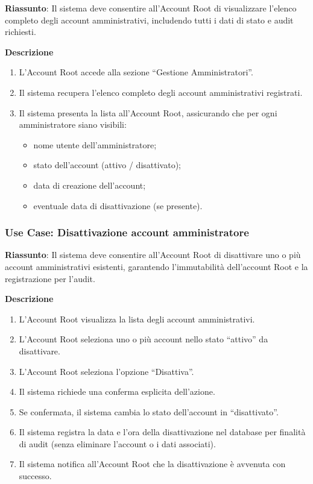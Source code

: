 \documentclass{article}
\begin{document}
\textbf{Riassunto}: Il sistema deve consentire all'Account Root di visualizzare l'elenco completo degli account amministrativi, includendo tutti i dati di stato e audit richiesti.

\textbf{Descrizione}
\begin{enumerate}
    \item L'Account Root accede alla sezione ``Gestione Amministratori''.
    \item Il sistema recupera l'elenco completo degli account amministrativi registrati.
    \item Il sistema presenta la lista all'Account Root, assicurando che per ogni amministratore siano visibili:
    \begin{itemize}
        \item nome utente dell'amministratore;
        \item stato dell'account (attivo / disattivato);
        \item data di creazione dell'account;
        \item eventuale data di disattivazione (se presente).
    \end{itemize}
\end{enumerate}

\subsubsection*{Use Case: Disattivazione account amministratore}

\textbf{Riassunto}: Il sistema deve consentire all'Account Root di disattivare uno o più account amministrativi esistenti, garantendo l'immutabilità dell'account Root e la registrazione per l'audit.

\textbf{Descrizione}
\begin{enumerate}
    \item L'Account Root visualizza la lista degli account amministrativi.
    \item L'Account Root seleziona uno o più account nello stato ``attivo'' da disattivare.
    \item L'Account Root seleziona l'opzione ``Disattiva''.
    \item Il sistema richiede una conferma esplicita dell'azione.
    \item Se confermata, il sistema cambia lo stato dell'account in ``disattivato''.
    \item Il sistema registra la data e l'ora della disattivazione nel database per finalità di audit (senza eliminare l'account o i dati associati).
    \item Il sistema notifica all'Account Root che la disattivazione è avvenuta con successo.
\end{enumerate}
\end{document}
